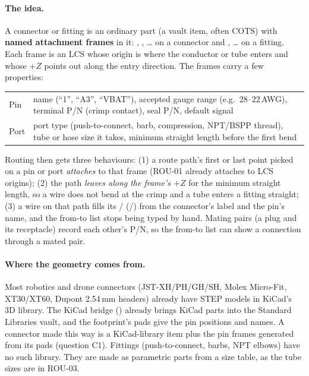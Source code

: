 \paragraph{The idea.} A connector or fitting is an ordinary part (a vault item, often COTS) with
\textbf{named attachment frames} in it: , , \dots{} on a connector and ,
\dots{} on a fitting. Each frame is an LCS whose origin is where the conductor or tube enters and whose $+Z$
points out along the entry direction. The frames carry a few properties:
\begin{center}
\small
\begin{tabularx}{\linewidth}{@{}lX@{}}
\toprule
Pin & name (``1'', ``A3'', ``VBAT''), accepted gauge range (e.g.\ 28--22\,AWG), terminal P/N (crimp contact),
      seal P/N, default signal\\
Port & port type (push-to-connect, barb, compression, NPT/BSPP thread), tube or hose size it takes, minimum
      straight length before the first bend\\
\bottomrule
\end{tabularx}
\end{center}
Routing then gets three behaviours: (1) a route path's first or last point picked on a pin or port
\emph{attaches} to that frame (ROU-01 already attaches to LCS origins); (2) the path \emph{leaves along the
frame's $+Z$} for the minimum straight length, so a wire does not bend at the crimp and a tube enters a fitting
straight; (3) a wire on that path fills its / (/) from the
connector's label and the pin's name, and the from-to list stops being typed by hand. Mating pairs (a plug and
its receptacle) record each other's P/N, so the from-to list can show a connection through a mated pair.

\paragraph{Where the geometry comes from.} Most robotics and drone connectors (JST-XH/PH/GH/SH, Molex
Micro-Fit, XT30/XT60, Dupont 2.54\,mm headers) already have STEP models in KiCad's 3D library. The KiCad
bridge () already brings KiCad parts into the Standard Libraries vault, and the footprint's pads
give the pin positions and names. A connector made this way is a KiCad-library item plus the pin frames
generated from its pads (question C1). Fittings (push-to-connect, barbs, NPT elbows) have no such library.
They are made as parametric parts from a size table, as the tube sizes are in ROU-03.

